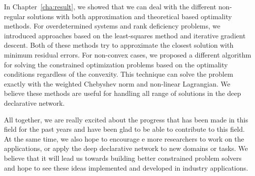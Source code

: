 \par In Chapter~\ref{cha:result}, we showed that we can deal with the different non-regular solutions with both approximation and theoretical based optimality methods. For overdetermined systems and rank deficiency problems, we introduced approaches based on the least-squares method and iterative gradient descent. Both of these methods try to approximate the closest solution with minimum residual errors. For non-convex cases, we proposed a different algorithm for solving the constrained optimization problems based on the optimality conditions regardless of the convexity. This technique can solve the problem exactly with the weighted Chebyshev norm and non-linear Lagrangian. We believe these methods are useful for handling all range of solutions in the deep declarative network. 
\par All together, we are really excited about the progress that has been made in this field for the past years and have been glad to be able to contribute to this field. At the same time, we also hope to encourage e more researchers to work on the applications, or apply the deep declarative network to new domains or tasks. We believe that it will lead us towards building better constrained problem solvers and hope to see these ideas implemented and developed in industry applications.